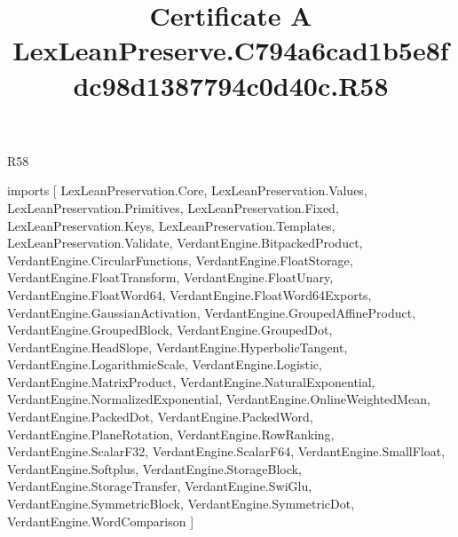\begin{lexlean}{R58}
\title{Certificate A LexLeanPreserve.C794a6cad1b5e8fdc98d1387794c0d40c.R58}
\begin{coremodule}
imports [
  LexLeanPreservation.Core,
  LexLeanPreservation.Values,
  LexLeanPreservation.Primitives,
  LexLeanPreservation.Fixed,
  LexLeanPreservation.Keys,
  LexLeanPreservation.Templates,
  LexLeanPreservation.Validate,
  VerdantEngine.BitpackedProduct,
  VerdantEngine.CircularFunctions,
  VerdantEngine.FloatStorage,
  VerdantEngine.FloatTransform,
  VerdantEngine.FloatUnary,
  VerdantEngine.FloatWord64,
  VerdantEngine.FloatWord64Exports,
  VerdantEngine.GaussianActivation,
  VerdantEngine.GroupedAffineProduct,
  VerdantEngine.GroupedBlock,
  VerdantEngine.GroupedDot,
  VerdantEngine.HeadSlope,
  VerdantEngine.HyperbolicTangent,
  VerdantEngine.LogarithmicScale,
  VerdantEngine.Logistic,
  VerdantEngine.MatrixProduct,
  VerdantEngine.NaturalExponential,
  VerdantEngine.NormalizedExponential,
  VerdantEngine.OnlineWeightedMean,
  VerdantEngine.PackedDot,
  VerdantEngine.PackedWord,
  VerdantEngine.PlaneRotation,
  VerdantEngine.RowRanking,
  VerdantEngine.ScalarF32,
  VerdantEngine.ScalarF64,
  VerdantEngine.SmallFloat,
  VerdantEngine.Softplus,
  VerdantEngine.StorageBlock,
  VerdantEngine.StorageTransfer,
  VerdantEngine.SwiGlu,
  VerdantEngine.SymmetricBlock,
  VerdantEngine.SymmetricDot,
  VerdantEngine.WordComparison
]


\end{coremodule}
\end{lexlean}

